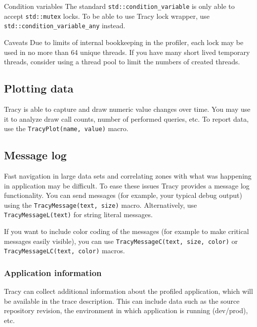 \documentclass[hidelinks,titlepage,a4paper]{article}
\begin{document}
\begin{bclogo}[
noborder=true,
couleur=black!5,
logo=\bclampe
]{Condition variables}
The standard \texttt{std::condition\_variable} is only able to accept \texttt{std::mutex} locks. To be able to use Tracy lock wrapper, use \texttt{std::condition\_variable\_any} instead.
\end{bclogo}

\begin{bclogo}[
noborder=true,
couleur=black!5,
logo=\bcattention
]{Caveats}
Due to limits of internal bookkeeping in the profiler, each lock may be used in no more than 64 unique threads. If you have many short lived temporary threads, consider using a thread pool to limit the numbers of created threads.
\end{bclogo}

\subsection{Plotting data}
\label{plottingdata}

Tracy is able to capture and draw numeric value changes over time. You may use it to analyze draw call counts, number of performed queries, etc. To report data, use the \texttt{TracyPlot(name, value)} macro.

\subsection{Message log}
\label{messagelog}

Fast navigation in large data sets and correlating zones with what was happening in application may be difficult. To ease these issues Tracy provides a message log functionality. You can send messages (for example, your typical debug output) using the \texttt{TracyMessage(text, size)} macro. Alternatively, use \texttt{TracyMessageL(text)} for string literal messages.

If you want to include color coding of the messages (for example to make critical messages easily visible), you can use \texttt{TracyMessageC(text, size, color)} or \texttt{TracyMessageLC(text, color)} macros.

\subsubsection{Application information}
\label{appinfo}

Tracy can collect additional information about the profiled application, which will be available in the trace description. This can include data such as the source repository revision, the environment in which application is running (dev/prod), etc.
\end{document}
